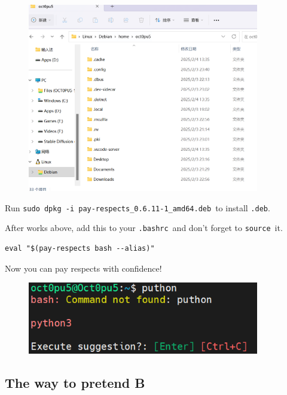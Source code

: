 \documentclass[12pt]{ctexart}
\begin{document}
\begin{figure}[H]
    \centering
    \includegraphics[width=0.9\textwidth,keepaspectratio]{assets/Linux/2.5 What's the first word when messing up a command/5.png}
\end{figure}

Run \texttt{sudo\ dpkg\ -i\ pay-respects\_0.6.11-1\_amd64.deb}\ to
install \texttt{.deb}.

After works above, add this to your \texttt{.bashrc}\ and
don't forget to \texttt{source}\ it.

\begin{adjustwidth}{2em}{0pt}
\begin{verbatim}
eval "$(pay-respects bash --alias)"
\end{verbatim}
\end{adjustwidth}

Now you can pay respects with confidence!

\begin{figure}[H]
    \centering
    \includegraphics[width=0.9\textwidth,keepaspectratio]{assets/Linux/2.5 What's the first word when messing up a command/7.png}
\end{figure}

\newpage
\subsection{\textbf{The way to pretend B}}
\end{document}
